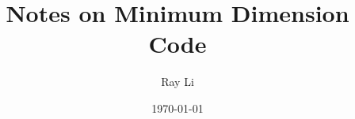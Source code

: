 \documentclass[12pt]{article}
\begin{document}
\title{Notes on Minimum Dimension Code}
\author{Ray Li}
\date{\today}
\maketitle

\tableofcontents





\end{document}
